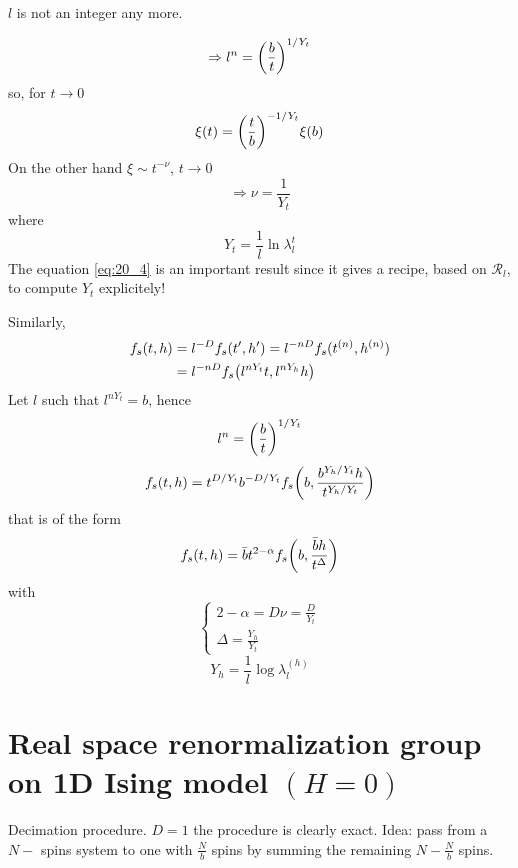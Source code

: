 \documentclass[../main/main.tex]{subfiles}
\begin{document}
\begin{remark}
\( l \) is not an integer any more.
\end{remark}
\begin{equation}
  \Rightarrow l^n = \qty(\frac{b}{t})^{1/Y_t}
\end{equation}
so, for \( t \rightarrow 0 \)
\begin{equation}
  \xi (t) = \qty(\frac{t}{b})^{-1/Y_t} \xi (b)
\end{equation}
On the other hand \( \xi \sim t^{-\nu } \), \( t \rightarrow 0 \)
\begin{equation}
  \Rightarrow \nu = \frac{1}{Y_t}
\end{equation}
where
\begin{equation}
  Y_t  = \frac{1}{l} \ln{\lambda _l^t}
  \label{eq:20_4}
\end{equation}
The equation \eqref{eq:20_4} is an important result since it gives a recipe, based on \( \mathcal{R}_l \), to compute \( Y_t \) explicitely!

Similarly,
\begin{equation}
\begin{split}
f_s (t,h)  &= l^{-D} f_s (t',h') = l^{-nD} f_s (t^{(n)},h^{(n)}) \\
& = l^{-nD} f_s \qty(l^{n Y_t}t, l^{n Y_h}h)
\end{split}
\end{equation}
Let \( l \) such that \( l^{n Y_t} = b \), hence
\begin{equation}
  l^n = \qty(\frac{b}{t})^{1/Y_t}
\end{equation}
\begin{equation}
  f_s (t,h) = t^{D/Y_t} b^{-D/Y_t} f_s \qty(b, \frac{b^{Y_h/Y_t}h}{t^{Y_h/Y_t}})
\end{equation}
that is of the form
\begin{equation}
  f_s (t,h) = \bar{b} t^{2- \alpha } f_s \qty(b, \frac{\bar{b} h}{t^{\Delta }})
\end{equation}
with
\begin{equation}
  \begin{cases}
   2 - \alpha = D \nu = \frac{D}{Y_t}\\
   \Delta = \frac{Y_h}{Y_t}
  \end{cases}
\end{equation}
\begin{equation}
  Y_h = \frac{1}{l} \log{\lambda _l^{(h)}}
\end{equation}

\section{Real space renormalization group on 1D Ising model \( (H=0) \)}
Decimation procedure.
\( D=1 \) the procedure is clearly exact. Idea: pass from a \( N- \) spins system to one with \( \frac{N}{b} \) spins by summing the remaining \( N- \frac{N}{b} \) spins.
\end{document}
